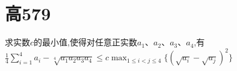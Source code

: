 \documentclass[question]{article}
\title{}
\author{}
\date{}
\begin{document}
\maketitle
\section{高579}{
求实数$c$的最小值,使得对任意正实数$a_1、a_2、a_3、a_4$,有\\
$\displaystyle\frac{1}{4}\sum\limits_{i=1}^4a_i-\sqrt[4]{a_1a_2a_3a_4}\leq c \max_{1\leq i<j\leq 4}{ \{(\sqrt{a_i}-\sqrt{a_j})^2\}}$
}
\end{document}
